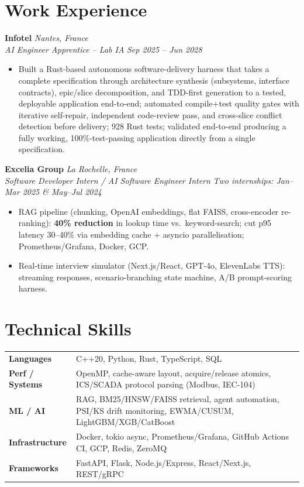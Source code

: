 \documentclass[10pt]{article}
\newcommand{\entry}[4]{%
  \noindent\textbf{#1} \hfill \textit{#2} \\
  \textit{#3} \hfill \textit{#4}\\[-0.22em]
}
\begin{document}
\section*{Work Experience}
\entry{Infotel}{Nantes, France}{AI Engineer Apprentice -- Lab IA}{Sep 2025 -- Jun 2028}
\begin{itemize}
  \item Built a Rust-based autonomous software-delivery harness that takes a complete specification through architecture synthesis (subsystems, interface contracts), epic/slice decomposition, and TDD-first generation to a tested, deployable application end-to-end; automated compile+test quality gates with iterative self-repair, independent code-review pass, and cross-slice conflict detection before delivery; 928 Rust tests; validated end-to-end producing a fully working, 100\%-test-passing application directly from a single specification.
\end{itemize}
\entry{Excelia Group}{La Rochelle, France}{Software Developer Intern / AI Software Engineer Intern}{Two internships: Jan--Mar 2025 \& May--Jul 2024}
\begin{itemize}
  \item RAG pipeline (chunking, OpenAI embeddings, flat FAISS, cross-encoder re-ranking): \textbf{40\% reduction} in lookup time vs.\ keyword-search; cut p95 latency 30--40\% via embedding cache + asyncio parallelisation; Prometheus/Grafana, Docker, GCP.
  \item Real-time interview simulator (Next.js/React, GPT-4o, ElevenLabs TTS): streaming responses, scenario-branching state machine, A/B prompt-scoring harness.
\end{itemize}

\section*{Technical Skills}
\noindent
\begin{tabular}{@{}p{2.7cm}p{15.5cm}@{}}
\textbf{Languages} & C++20, Python, Rust, TypeScript, SQL \\
\textbf{Perf / Systems} & OpenMP, cache-aware layout, acquire/release atomics, ICS/SCADA protocol parsing (Modbus, IEC-104) \\
\textbf{ML / AI} & RAG, BM25/HNSW/FAISS retrieval, agent automation, PSI/KS drift monitoring, EWMA/CUSUM, LightGBM/XGB/CatBoost \\
\textbf{Infrastructure} & Docker, tokio async, Prometheus/Grafana, GitHub Actions CI, GCP, Redis, ZeroMQ \\
\textbf{Frameworks} & FastAPI, Flask, Node.js/Express, React/Next.js, REST/gRPC \\
\end{tabular}
\end{document}
